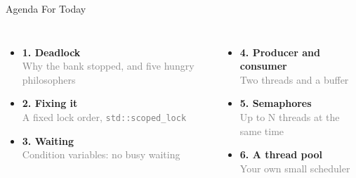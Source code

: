 \documentclass[aspectratio=169,10pt]{beamer}
\begin{document}
\begin{frame}{Agenda For Today}
  \begin{columns}[T,onlytextwidth]
      \large
      \begin{itemize}
        \item[\textcolor{DeepBlue}{\faLock}] \textbf{1. Deadlock} \\
        \textcolor{gray}{\small Why the bank stopped, and five hungry philosophers}
        \vspace{0.3cm}

        \item[\textcolor{DeepBlue}{\faCheck}] \textbf{2. Fixing it} \\
        \textcolor{gray}{\small A fixed lock order, \texttt{std::scoped\_lock}}
        \vspace{0.3cm}

        \item[\textcolor{DeepBlue}{\faHourglassHalf}] \textbf{3. Waiting} \\
        \textcolor{gray}{\small Condition variables: no busy waiting}
      \end{itemize}
      \large
      \begin{itemize}
        \item[\textcolor{DeepBlue}{\faIcon{exchange-alt}}] \textbf{4. Producer and consumer} \\
        \textcolor{gray}{\small Two threads and a buffer}
        \vspace{0.3cm}

        \item[\textcolor{DeepBlue}{\faParking}] \textbf{5. Semaphores} \\
        \textcolor{gray}{\small Up to N threads at the same time}
        \vspace{0.3cm}

        \item[\textcolor{DeepBlue}{\faCogs}] \textbf{6. A thread pool} \\
        \textcolor{gray}{\small Your own small scheduler}
      \end{itemize}
  \end{columns}
\end{frame}
\end{document}
